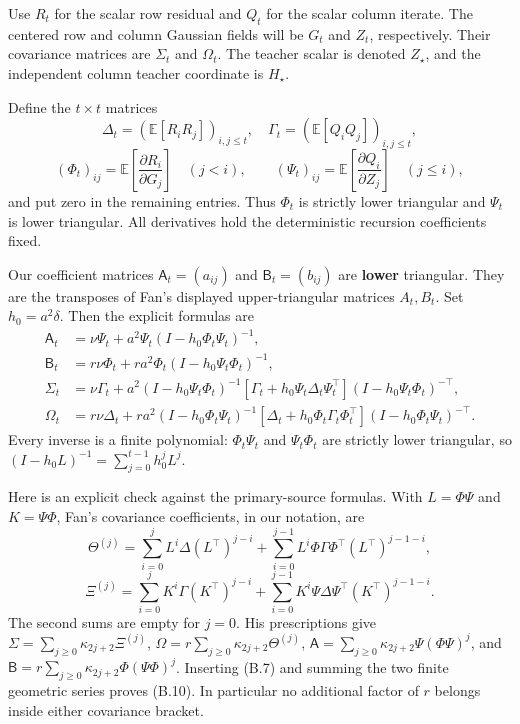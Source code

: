 \documentclass[
  11pt,
  a4paper,
]{article}
\begin{document}
Use \(R_t\) for the scalar row residual and \(Q_t\) for the scalar
column iterate. The centered row and column Gaussian fields will be
\(G_t\) and \(Z_t\), respectively. Their covariance matrices are
\(\Sigma_t\) and \(\Omega_t\). The teacher scalar is denoted
\(Z_\star\), and the independent column teacher coordinate is
\(H_\star\).

Define the \(t\times t\) matrices \[
\Delta_t=(\mathbb E[R_iR_j])_{i,j\le t},\quad
\Gamma_t=(\mathbb E[Q_iQ_j])_{i,j\le t},
\] \[
(\Phi_t)_{ij}=\mathbb E\left[\frac{\partial R_i}{\partial G_j}\right]
\quad(j<i),\qquad
(\Psi_t)_{ij}=\mathbb E\left[\frac{\partial Q_i}{\partial Z_j}\right]
\quad(j\le i),
\tag{B.9}
\] and put zero in the remaining entries. Thus \(\Phi_t\) is strictly
lower triangular and \(\Psi_t\) is lower triangular. All derivatives
hold the deterministic recursion coefficients fixed.

Our coefficient matrices \(\mathsf A_t=(a_{ij})\) and
\(\mathsf B_t=(b_{ij})\) are \textbf{lower} triangular. They are the
transposes of Fan's displayed upper-triangular matrices \(A_t,B_t\). Set
\(h_0=a^2\delta\). Then the explicit formulas are \[
\boxed{\begin{aligned}
\mathsf A_t&=\nu\Psi_t+a^2\Psi_t(I-h_0\Phi_t\Psi_t)^{-1},\\
\mathsf B_t&=r\nu\Phi_t+ra^2\Phi_t(I-h_0\Psi_t\Phi_t)^{-1},\\
\Sigma_t&=\nu\Gamma_t+a^2(I-h_0\Psi_t\Phi_t)^{-1}
\left[\Gamma_t+h_0\Psi_t\Delta_t\Psi_t^\top\right]
(I-h_0\Psi_t\Phi_t)^{-\top},\\
\Omega_t&=r\nu\Delta_t+ra^2(I-h_0\Phi_t\Psi_t)^{-1}
\left[\Delta_t+h_0\Phi_t\Gamma_t\Phi_t^\top\right]
(I-h_0\Phi_t\Psi_t)^{-\top}.
\end{aligned}}
\tag{B.10}
\] Every inverse is a finite polynomial: \(\Phi_t\Psi_t\) and
\(\Psi_t\Phi_t\) are strictly lower triangular, so
\((I-h_0L)^{-1}=\sum_{j=0}^{t-1}h_0^jL^j\).

Here is an explicit check against the primary-source formulas. With
\(L=\Phi\Psi\) and \(K=\Psi\Phi\), Fan's covariance coefficients, in our
notation, are \[
\Theta^{(j)}=\sum_{i=0}^jL^i\Delta(L^\top)^{j-i}
+\sum_{i=0}^{j-1}L^i\Phi\Gamma\Phi^\top(L^\top)^{j-1-i},
\] \[
\Xi^{(j)}=\sum_{i=0}^jK^i\Gamma(K^\top)^{j-i}
+\sum_{i=0}^{j-1}K^i\Psi\Delta\Psi^\top(K^\top)^{j-1-i}.
\] The second sums are empty for \(j=0\). His prescriptions give
\(\Sigma=\sum_{j\ge0}\kappa_{2j+2}\Xi^{(j)}\),
\(\Omega=r\sum_{j\ge0}\kappa_{2j+2}\Theta^{(j)}\),
\(\mathsf A=\sum_{j\ge0}\kappa_{2j+2}\Psi(\Phi\Psi)^j\), and
\(\mathsf B=r\sum_{j\ge0}\kappa_{2j+2}\Phi(\Psi\Phi)^j\). Inserting
(B.7) and summing the two finite geometric series proves (B.10). In
particular no additional factor of \(r\) belongs inside either
covariance bracket.
\end{document}
